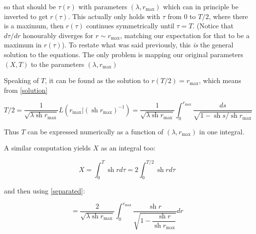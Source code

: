 \documentclass{article}
\newcommand{\rmax}{ r_\text{max} }
\renewcommand{\sinh}{\operatorname{sh}}
\begin{document}
so that should be $\tau(r)$ with parameters $(\lambda,\rmax)$ which can in principle be inverted to get $r(\tau)$. This actually only holds with $\tau$ from $0$ to $T/2$, where there is a maximum, then $r(\tau)$ continues symmetrically until $\tau = T$. (Notice that $d\tau/dr$ honourably diverges for $r\sim \rmax$, matching our expectation for that to be a maximum in $r(\tau)$). To restate what was said previously, this \emph{is} the general solution to the equations. The only problem is mapping our original parameters $(X,T)$ to the parameters $(\lambda,\rmax)$

Speaking of $T$, it can be found as the solution to $r(T/2) = \rmax$, which means from \eqref{solution}

\begin{equation}
	T/2 = \frac{1}{\sqrt{\lambda \sinh \rmax  } } L(\rmax | (\sinh \rmax )^{-1}) = \frac{1}{\sqrt{\lambda \sinh\rmax } } \int_0^{\rmax} \frac{ds}{\sqrt{1-\sinh s /\sinh \rmax  } }
	\label{}
\end{equation}

Thus $T$ can be expressed numerically as a function of $(\lambda,\rmax)$ in one integral.

A similar computation yields $X$ as an integral too:

\begin{equation}
	X = \int_0^T \sinh r  d\tau = 2 \int_0^{T/2} \sinh r d\tau 
	\label{}
\end{equation}

and then using \eqref{separated}:

\begin{equation}
	= \frac{2}{\sqrt{\lambda \sinh \rmax  } } \int_0^{\rmax} \frac{\sinh r}{\sqrt{1- \dfrac{\sinh r}{\sinh \rmax }}} dr
\end{equation}
\end{document}
